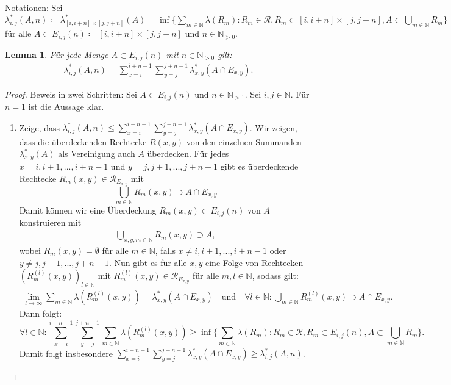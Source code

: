 \documentclass[a4paper,DIV=1]{article}
\theoremstyle{plain}
\newtheorem{lemma}{Lemma}
\begin{document}
Notationen: Sei $\lambda_{i,j}^*(A,n) \coloneqq \lambda_{[i,i+n] \times [j,j+n]}^*(A) = \inf\{ \sum\limits_{m \in \mathbb N} \lambda(R_m) : R_m \in \mathcal R, R_m \subset [i,i+n] \times [j,j+n], A \subset \bigcup\limits_{m \in \mathbb N} R_m \}$ für alle $A \subset E_{i,j}(n) \coloneqq [i, i+n] \times [j,j + n]$ und $n \in \mathbb N_{> 0}$.

\begin{lemma}\label{lemmalom}
	Für jede Menge $A \subset E_{i,j}(n)$ mit $n \in \mathbb N_{>0}$ gilt:
	\begin{align} \label{lemmma}
		\lambda_{i,j}^*(A,n) = \sum^{i+n-1}_{x=i}\sum^{j+n-1}_{y=j} \lambda_{x,y}^*(A \cap E_{x,y}).
	\end{align}
\end{lemma}

\begin{proof}
	Beweis in zwei Schritten: Sei $A \subset E_{i,j}(n)$ und $n \in \mathbb N_{>1}$. Sei $i,j \in \mathbb N$. Für $n = 1$ ist die Aussage klar.
	\begin{enumerate}
		\item Zeige, dass $\lambda_{i,j}^*(A,n) \leq  \sum^{i+n-1}_{x=i}\sum^{j+n-1}_{y=j} \lambda_{x,y}^*(A \cap E_{x,y})$. Wir zeigen, dass die überdeckenden Rechtecke $R(x,y)$ von den einzelnen Summanden $\lambda_{x,y}^*(A)$ als Vereinigung auch $A$ überdecken. Für jedes $x = i,i+1,...,i+n-1$ und $y = j,j+1,...,j+n-1$ gibt es überdeckende Rechtecke $R_m(x,y) \in \mathcal R_{E_{x,y}}$ mit
		\[
			\bigcup\limits_{m \in \mathbb N} R_m(x,y) \supset A \cap E_{x,y}
		\]
		Damit können wir eine Überdeckung $R_m(x,y) \subset E_{i,j}(n)$ von $A$ konstruieren mit 
		\begin{align*}\label{langweilig}
			\bigcup\limits_{x,y,m \in \mathbb N} R_m(x,y) \supset A,
		\end{align*}
		 wobei $R_m(x,y) = \emptyset$ für alle $m \in \mathbb N$, falls $x \neq i,i+1,...,i+n-1$ oder $y \neq j,j+1,...,j+n-1$. Nun gibt es für alle $x,y$ eine Folge von Rechtecken $(R^{(l)}_{m}(x,y))_{l \in \mathbb N}$ mit $R_m^{(l)}(x,y) \in \mathcal R_{E_{x,y}}$ für alle $m,l \in \mathbb N$, sodass gilt:
		 \begin{gather*}
		 	\lim_{l \to \infty}\sum_{m \in \mathbb N}\lambda(R^{(l)}_{m}(x,y)) = \lambda_{x,y}^*(A \cap E_{x,y}) \quad \text{und} \quad 
		 	\forall l \in \mathbb N: \bigcup_{m \in \mathbb N}R^{(l)}_{m}(x,y) \supset A \cap E_{x,y}.
		 \end{gather*}
		 Dann folgt: 
		 \[
		  \forall l \in \mathbb N: \sum^{i+n-1}_{x=i}\sum^{j+n-1}_{y=j} \sum_{m \in \mathbb N} \lambda(R_m^{(l)}(x,y)) \geq  \inf\{ \sum\limits_{m \in \mathbb N} \lambda(R_m) : R_m \in \mathcal R, R_m \subset E_{i,j}(n), A \subset \bigcup\limits_{m \in \mathbb N} R_m \}.
		 \]
		 Damit folgt insbesondere $\sum^{i+n-1}_{x=i}\sum^{j+n-1}_{y=j} \lambda_{x,y}^*(A \cap E_{x,y}) \geq \lambda_{i,j}^*(A,n)$.
		 

\end{enumerate}
\end{proof}
\end{document}
